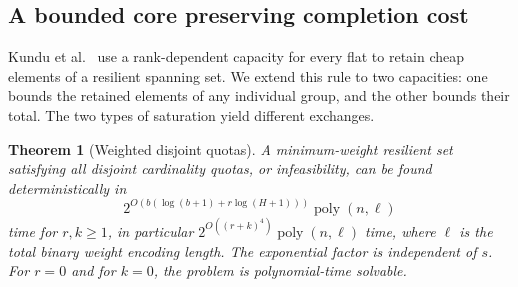 \documentclass[11pt]{article}
\newtheorem{theorem}{Theorem}[section]
\theoremstyle{definition}
\theoremstyle{remark}\newtheorem{remark}[theorem]{Remark}
\begin{document}
\subsection{A bounded core preserving completion cost}
Kundu et al.~\cite[Lemma~5]{KNS} use a rank-dependent capacity for
every flat to retain cheap elements of a resilient spanning set.
We extend this rule to two capacities: one bounds the retained
elements of any individual group, and the other bounds their total.
The two types of saturation yield different exchanges.

\begin{theorem}[Weighted disjoint quotas]\label{thm:quota-fpt}
A minimum-weight resilient set satisfying all disjoint cardinality
quotas, or infeasibility, can be found deterministically in
\[
 2^{O(b(\log(b+1)+r\log(H+1)))}\operatorname{poly}(n,\ell)
\]
time for $r,k\ge1$, in particular
$2^{O((r+k)^4)}\operatorname{poly}(n,\ell)$ time, where $\ell$ is the total binary weight
encoding length. The exponential factor is independent of $s$.
For $r=0$ and for $k=0$, the problem is polynomial-time solvable.
\end{theorem}
\end{document}
